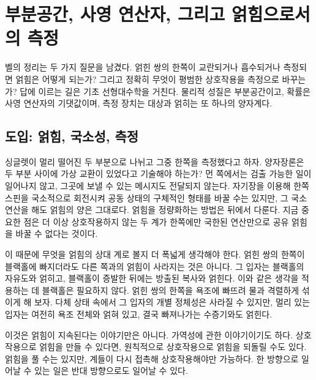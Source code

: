 \chapter{부분공간, 사영 연산자, 그리고 얽힘으로서의 측정}

벨의 정리는 두 가지 질문을 남겼다. 얽힌 쌍의 한쪽이 교란되거나 흡수되거나 측정되면 얽힘은 어떻게 되는가? 그리고 정확히 무엇이 평범한 상호작용을 측정으로 바꾸는가? 답에 이르는 길은 기초 선형대수학을 거친다. 물리적 성질은 부분공간이고, 확률은 사영 연산자의 기댓값이며, 측정 장치는 대상과 얽히는 또 하나의 양자계다.

\section{도입: 얽힘, 국소성, 측정}

싱글렛이 멀리 떨어진 두 부분으로 나뉘고 그중 한쪽을 측정했다고 하자. 양자장론은 두 부분 사이에 가상 교환이 있었다고 기술해야 하는가? 먼 쪽에서는 검출 가능한 일이 일어나지 않고, 그곳에 보낼 수 있는 메시지도 전달되지 않는다. 자기장을 이용해 한쪽 스핀을 국소적으로 회전시켜 공동 상태의 구체적인 형태를 바꿀 수는 있지만, 그 국소 연산을 해도 얽힘의 양은 그대로다. 얽힘을 정량화하는 방법은 뒤에서 다룬다. 지금 중요한 점은 더 이상 상호작용하지 않는 두 계가 한쪽에만 국한된 연산만으로 공유 얽힘을 바꿀 수 없다는 것이다.

\begin{classroomqa}\end{classroomqa}

이 때문에 무엇을 얽힘의 상대 계로 볼지 더 폭넓게 생각해야 한다. 얽힌 쌍의 한쪽이 블랙홀에 빠지더라도 다른 쪽과의 얽힘이 사라지는 것은 아니다. 그 입자는 블랙홀의 자유도와 얽히고, 블랙홀이 증발한 뒤에는 방출된 복사와 얽힌다. 이와 같은 생각을 적용하는 데 블랙홀은 필요하지 않다. 얽힌 쌍의 한쪽을 욕조에 빠뜨려 물과 격렬하게 섞이게 해 보자. 다체 상태 속에서 그 입자의 개별 정체성은 사라질 수 있지만, 멀리 있는 입자는 여전히 욕조 전체와 얽혀 있고, 결국 빠져나가는 수증기와도 얽힌다.

이것은 얽힘이 지속된다는 이야기만은 아니다. 가역성에 관한 이야기이기도 하다. 상호작용으로 얽힘을 만들 수 있다면, 원칙적으로 상호작용으로 얽힘을 되돌릴 수도 있다. 얽힘을 풀 수는 있지만, 계들이 다시 접촉해 상호작용해야만 가능하다. 한 방향으로 일어날 수 있는 일은 반대 방향으로도 일어날 수 있다.

